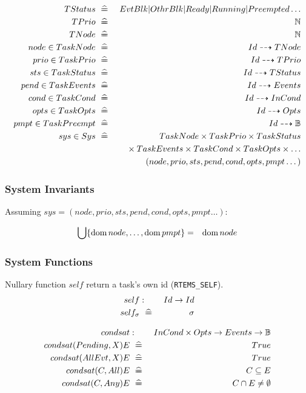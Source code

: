 \begin{eqnarray*}
   TStatus &\defs& EvtBlk | OthrBlk | Ready | Running | Preempted \dots
\\ TPrio &\defs& \Nat
\\ TNode &\defs& \Nat
\\ node \in TaskNode &\defs& Id \pfun TNode
\\ prio \in TaskPrio &\defs& Id \pfun TPrio
\\ sts \in TaskStatus &\defs& Id \pfun TStatus
\\ pend \in TaskEvents &\defs& Id \pfun Events
\\ cond \in TaskCond &\defs& Id \pfun InCond
\\ opts \in TaskOpts &\defs& Id \pfun Opts
\\ pmpt \in TaskPreempt &\defs& Id \pfun \Bool
\\ sys \in Sys
   &\defs&
   TaskNode
   \times TaskPrio
   \times TaskStatus
\\ && {} \times TaskEvents
   \times TaskCond
   \times TaskOpts
   \times \dots
\\ && (node,prio,sts,pend,cond,opts,pmpt\dots)
\end{eqnarray*}

\subsubsection{System Invariants}

Assuming $sys = (node,prio,sts,pend,cond,opts,pmpt\dots)$:

\begin{eqnarray*}
  \bigcup
    \{
      \mathop{\mathrm{dom}} node
      , \dots ,
      \mathop{\mathrm{dom}} pmpt
    \} &=& \mathop{\mathrm{dom}} node
\end{eqnarray*}

\subsubsection{System Functions}

Nullary function $self$ return a task's own id (\texttt{RTEMS\_SELF}).
\begin{eqnarray*}
   self &:& Id \rightarrow Id
\\ self_\sigma &\mathrel{~\widehat{=\!\!\!\!=}}~& \sigma
\end{eqnarray*}

\begin{eqnarray*}
   condsat &:& InCond \times Opts \fun Events \fun \Bool
\\ condsat(Pending,X)E &\defs& \True
\\ condsat(AllEvt,X)E     &\defs& \True
\\ condsat(C,All)E &\defs& C \subseteq E
\\ condsat(C,Any)E &\defs& C \cap E \neq \emptyset
\end{eqnarray*}

